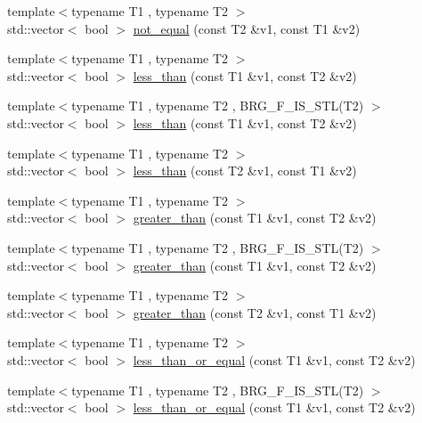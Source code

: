 \begin{DoxyCompactItemize}
\item 
{\footnotesize template$<$typename T1 , typename T2 $>$ }\\std\-::vector$<$ bool $>$ \hyperlink{namespaceIceBRG_a4ae596505d9c9552fe386013ddeb5613}{not\-\_\-equal} (const T2 \&v1, const T1 \&v2)
\item 
{\footnotesize template$<$typename T1 , typename T2 $>$ }\\std\-::vector$<$ bool $>$ \hyperlink{namespaceIceBRG_a68bb47b54ce71cba64e8994fe85dfc24}{less\-\_\-than} (const T1 \&v1, const T2 \&v2)
\item 
{\footnotesize template$<$typename T1 , typename T2 , B\-R\-G\-\_\-\-F\-\_\-\-I\-S\-\_\-\-S\-T\-L(\-T2) $>$ }\\std\-::vector$<$ bool $>$ \hyperlink{namespaceIceBRG_ad9a6b93cf1e50003bcaf98d4ef6f537a}{less\-\_\-than} (const T1 \&v1, const T2 \&v2)
\item 
{\footnotesize template$<$typename T1 , typename T2 $>$ }\\std\-::vector$<$ bool $>$ \hyperlink{namespaceIceBRG_a56d63b814bffc9554df6af62e49826d8}{less\-\_\-than} (const T2 \&v1, const T1 \&v2)
\item 
{\footnotesize template$<$typename T1 , typename T2 $>$ }\\std\-::vector$<$ bool $>$ \hyperlink{namespaceIceBRG_a1d302939f700d169e47b7224d5280063}{greater\-\_\-than} (const T1 \&v1, const T2 \&v2)
\item 
{\footnotesize template$<$typename T1 , typename T2 , B\-R\-G\-\_\-\-F\-\_\-\-I\-S\-\_\-\-S\-T\-L(\-T2) $>$ }\\std\-::vector$<$ bool $>$ \hyperlink{namespaceIceBRG_a0048345d5175e50882e7785f6b9c66ac}{greater\-\_\-than} (const T1 \&v1, const T2 \&v2)
\item 
{\footnotesize template$<$typename T1 , typename T2 $>$ }\\std\-::vector$<$ bool $>$ \hyperlink{namespaceIceBRG_a59cb42b81ab02e1d00efad0d798a3e2d}{greater\-\_\-than} (const T2 \&v1, const T1 \&v2)
\item 
{\footnotesize template$<$typename T1 , typename T2 $>$ }\\std\-::vector$<$ bool $>$ \hyperlink{namespaceIceBRG_a12020ef392d57258d20eea92c0033a74}{less\-\_\-than\-\_\-or\-\_\-equal} (const T1 \&v1, const T2 \&v2)
\item 
{\footnotesize template$<$typename T1 , typename T2 , B\-R\-G\-\_\-\-F\-\_\-\-I\-S\-\_\-\-S\-T\-L(\-T2) $>$ }\\std\-::vector$<$ bool $>$ \hyperlink{namespaceIceBRG_aac59a44862c5669775ff2eb2ee78c92e}{less\-\_\-than\-\_\-or\-\_\-equal} (const T1 \&v1, const T2 \&v2)

\end{DoxyCompactItemize}
